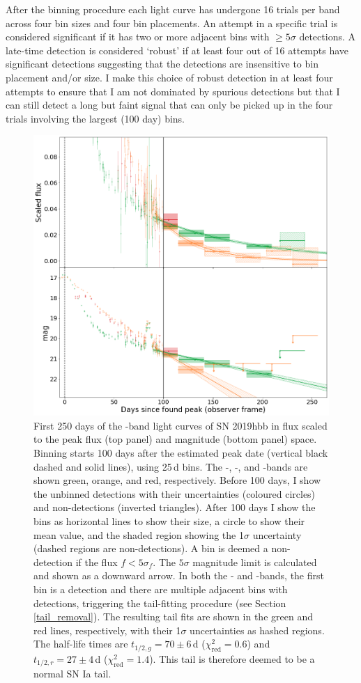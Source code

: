 \documentclass[a4paper,oneside,12pt, class=Latex/Classes/PhDthesisPSnPDF, crop=false]{standalone}
\begin{document}
After the binning procedure each light curve has undergone 16 trials per band across four bin sizes and four bin placements. An attempt in a specific trial is considered significant if it has two or more adjacent bins with $\ge5\sigma$ detections. A late-time detection is considered `robust' if at least four out of 16 attempts have significant detections suggesting that the detections are insensitive to bin placement and/or size. I make this choice of robust detection in at least four attempts to ensure that I am not dominated by spurious detections but that I can still detect a long but faint signal that can only be picked up in the four trials involving the largest (100 day) bins. 

\begin{figure}
 \centering
 \includegraphics[width=\textwidth]{../Images/chapter_3/bin_showcase.png}
 \caption{First 250 days of the \ztfg\ztfr\ztfi-band light curves of SN 2019hbb in flux scaled to the peak flux (top panel) and magnitude (bottom panel) space. Binning starts 100 days after the estimated peak date (vertical black dashed and solid lines), using 25\,d bins. The \ztfg-, \ztfr-, and \ztfi-bands are shown green, orange, and red, respectively. Before 100 days, I show the unbinned detections with their uncertainties (coloured circles) and non-detections (inverted triangles). After 100 days I show the bins as horizontal lines to show their size, a circle to show their mean value, and the shaded region showing the 1$\sigma$ uncertainty (dashed regions are non-detections). A bin is deemed a non-detection if the flux $f<5\sigma_f$. The $5\sigma$ magnitude limit is calculated and shown as a downward arrow. In both the \ztfg- and \ztfr-bands, the first bin is a detection and there are multiple adjacent bins with detections, triggering the tail-fitting procedure (see Section \ref{tail_removal}). The resulting tail fits are shown in the green and red lines, respectively, with their 1$\sigma$ uncertainties as hashed regions. The half-life times are $t_{1/2,g} = 70 \pm 6$\,d ($\chi^2_\text{red} = 0.6$) and $t_{1/2,r} = 27 \pm 4$\,d ($\chi^2_\text{red} = 1.4$). This tail is therefore deemed to be a normal SN Ia tail.}

\end{figure}
\end{document}
